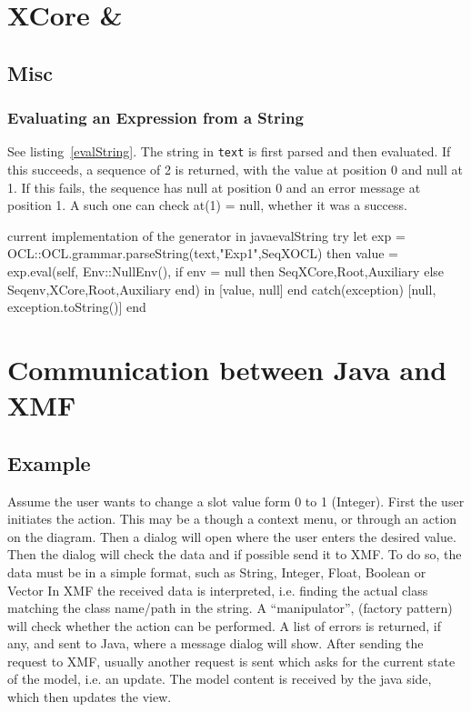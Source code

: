 \documentclass [11pt,letterpaper,twoside,openright]{book}
\begin{document}
\tableofcontents

\chapter{XCore \& {\FMMLx}}

\section{Misc}
\subsection{Evaluating an Expression from a String} 

See listing~\ref{evalString}. The string in \texttt{text} is first parsed and then evaluated. If this succeeds, a sequence of 2 is returned, with the value at position 0 and null at 1. If this fails, the sequence has null at position 0 and an error message at position 1. 
A such one can check at(1) = null, whether it was a success.

\begin{lstfloat}
\begin{XOCL}{current implementation of the generator in java}{evalString}
try
  let
    exp = OCL::OCL.grammar.parseString(text,"Exp1",Seq{XOCL})
  then
    value = exp.eval(self,
                     Env::NullEnv(),
                     if env = null
                       then Seq{XCore,Root,Auxiliary} 
                       else Seq{env,XCore,Root,Auxiliary} 
                     end)
  in
    [value, null]
  end
catch(exception)
  [null, exception.toString()]
end
\end{XOCL}
\end{lstfloat}
\chapter{Communication between Java and XMF}

\section{Example}
Assume the user wants to change a slot value form 0 to 1 (Integer). 
First the user initiates the action. This may be a though a context menu, or through an action on the diagram.
Then a dialog will open where the user enters the desired value. 
Then the dialog will check the data and if possible send it to XMF.
To do so, the data must be in a simple format, such as String, Integer, Float, Boolean or Vector
In XMF the received data is interpreted, i.e. finding the actual class matching the class name/path in the string.
A ``manipulator'', (factory pattern) will check whether the action can be performed. 
A list of errors is returned, if any, and sent to Java, where a message dialog will show.
After sending the request to XMF, usually another request is sent which asks for the current state of the model, i.e. an update. 
The model content is received by the java side, which then updates the view.
\end{document}
